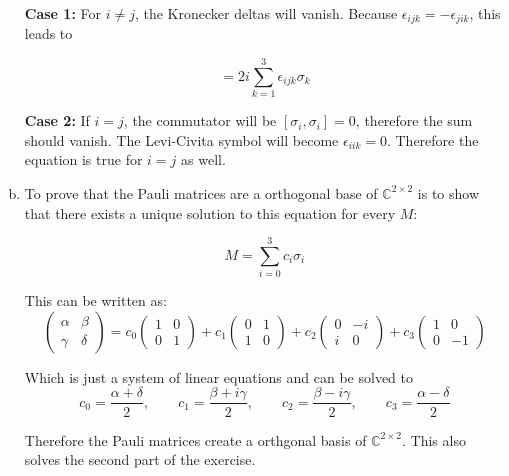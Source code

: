 \documentclass[a4paper,german,12pt,smallheadings]{scrartcl}
\begin{document}
\begin{enumerate}[a)]
    \textbf{Case 1:} For $i \neq j$, the Kronecker deltas will vanish.  Because $\epsilon_{ijk}
    = -\epsilon_{jik}$, this leads to

    \begin{equation*}
      [\sigma_i, \sigma_j] = 2i \sum_{k=1}^3 \epsilon_{ijk} \sigma_k
    \end{equation*}

    \textbf{Case 2:} If $i=j$, the commutator will be $[\sigma_i, \sigma_i] =
    0$, therefore the sum should vanish. The Levi-Civita symbol will
    become $\epsilon_{iik} = 0$. Therefore the equation is true for $i = j$ as
    well.
  \item
    To prove that the Pauli matrices are a orthogonal base of $\mathbb{C}^{2
    \times 2}$ is to show that there exists a unique solution to this equation
    for every $M$:

    \begin{equation*}
    M = \sum_{i=0}^3 c_i \sigma_i
    \end{equation*}

    This can be written as:
    \begin{equation*}
      \begin{pmatrix}
        \alpha & \beta \\ \gamma & \delta
      \end{pmatrix}
      =
      c_0
      \begin{pmatrix}
        1 & 0 \\
        0 & 1
      \end{pmatrix}
      +
      c_1
      \begin{pmatrix}
        0 & 1 \\
        1 & 0
      \end{pmatrix}
      +
      c_2
      \begin{pmatrix}
        0 & -i \\
        i & 0
      \end{pmatrix}
      +
      c_3
      \begin{pmatrix}
        1 & 0 \\
        0 & -1
      \end{pmatrix}
    \end{equation*}

    Which is just a system of linear equations and can be solved to
    \begin{equation*}
      c_0 = \frac{\alpha + \delta}{2}, \qquad
      c_1 = \frac{\beta + i \gamma}{2}, \qquad
      c_2 = \frac{\beta - i \gamma}{2}, \qquad
      c_3 = \frac{\alpha - \delta}{2}
    \end{equation*}

    Therefore the Pauli matrices create a orthgonal basis of $\mathbb{C}^{2
    \times 2}$. This also solves the second part of the exercise.
\end{enumerate}
\end{document}
